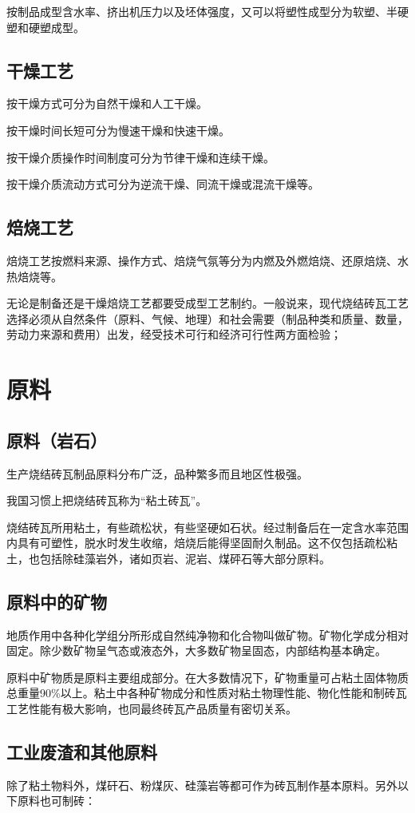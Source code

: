 \documentclass{ctexbook}
\begin{document}
按制品成型含水率、挤出机压力以及坯体强度，又可以将塑性成型分为软塑、半硬塑和硬塑成型。
\subsection{干燥工艺}
按干燥方式可分为自然干燥和人工干燥。

按干燥时间长短可分为慢速干燥和快速干燥。

按干燥介质操作时间制度可分为节律干燥和连续干燥。

按干燥介质流动方式可分为逆流干燥、同流干燥或混流干燥等。
\subsection{焙烧工艺}
焙烧工艺按燃料来源、操作方式、焙烧气氛等分为内燃及外燃焙烧、还原焙烧、水热焙烧等。

无论是制备还是干燥焙烧工艺都要受成型工艺制约。一般说来，现代烧结砖瓦工艺选择必须从自然条件（原料、气候、地理）和社会需要（制品种类和质量、数量，劳动力来源和费用）出发，经受技术可行和经济可行性两方面检验；
\section{原料}
\subsection{原料（岩石）}
生产烧结砖瓦制品原料分布广泛，品种繁多而且地区性极强。

我国习惯上把烧结砖瓦称为“粘土砖瓦”。

烧结砖瓦所用粘土，有些疏松状，有些坚硬如石状。经过制备后在一定含水率范围内具有可塑性，脱水时发生收缩，焙烧后能得坚固耐久制品。这不仅包括疏松粘土，也包括除硅藻岩外，诸如页岩、泥岩、煤砰石等大部分原料。
\subsection{原料中的矿物}
地质作用中各种化学组分所形成自然纯净物和化合物叫做矿物。矿物化学成分相对固定。除少数矿物呈气态或液态外，大多数矿物呈固态，内部结构基本确定。

原料中矿物质是原料主要组成部分。在大多数情况下，矿物重量可占粘土固体物质总重量90\%以上。粘土中各种矿物成分和性质对粘土物理性能、物化性能和制砖瓦工艺性能有极大影响，也同最终砖瓦产品质量有密切关系。
\subsection{工业废渣和其他原料}
除了粘土物料外，煤矸石、粉煤灰、硅藻岩等都可作为砖瓦制作基本原料。另外以下原料也可制砖：
\end{document}
